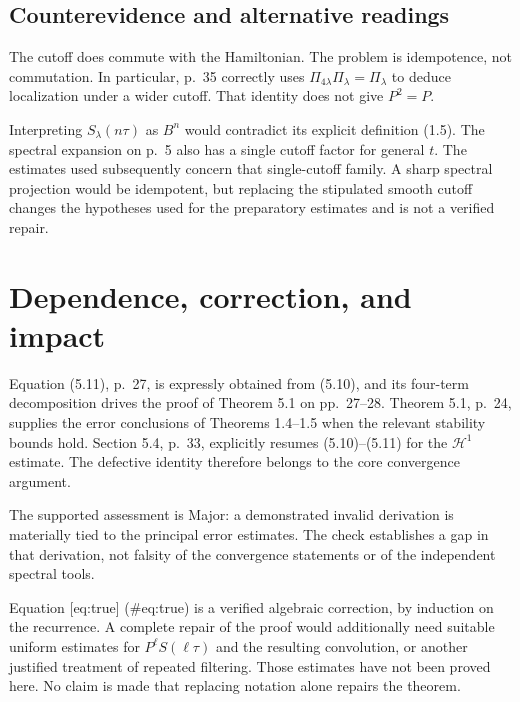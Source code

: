 \documentclass[10pt]{article}
\begin{document}
\subsection*{Counterevidence and alternative readings}
The cutoff does commute with the Hamiltonian. The problem is idempotence, not commutation. In particular, p. 35 correctly uses \(\Pi_{4\lambda}\Pi_\lambda=\Pi_\lambda\) to deduce localization under a wider cutoff. That identity does not give \(P^2=P\).\par
Interpreting \(S_\lambda(n\tau)\) as \(B^n\) would contradict its explicit definition (1.5). The spectral expansion on p. 5 also has a single cutoff factor for general \(t\). The estimates used subsequently concern that single-cutoff family. A sharp spectral projection would be idempotent, but replacing the stipulated smooth cutoff changes the hypotheses used for the preparatory estimates and is not a verified repair.\par
\section*{Dependence, correction, and impact}
Equation (5.11), p. 27, is expressly obtained from (5.10), and its four-term decomposition drives the proof of Theorem 5.1 on pp. 27–28. Theorem 5.1, p. 24, supplies the error conclusions of Theorems 1.4–1.5 when the relevant stability bounds hold. Section 5.4, p. 33, explicitly resumes (5.10)–(5.11) for the \(\mathcal H^1\) estimate. The defective identity therefore belongs to the core convergence argument.\par
The supported assessment is Major: a demonstrated invalid derivation is materially tied to the principal error estimates. The check establishes a gap in that derivation, not falsity of the convergence statements or of the independent spectral tools.\par
Equation [eq:true] (\#eq:true) is a verified algebraic correction, by induction on the recurrence. A complete repair of the proof would additionally need suitable uniform estimates for \(P^\ell S(\ell\tau)\) and the resulting convolution, or another justified treatment of repeated filtering. Those estimates have not been proved here. No claim is made that replacing notation alone repairs the theorem.\par
\end{document}
